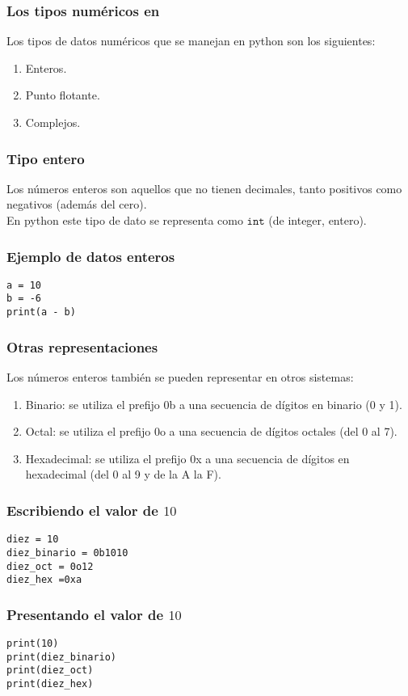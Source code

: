 \documentclass[12pt]{beamer}
\begin{document}
\begin{frame}
\frametitle{Los tipos numéricos en \python}
Los tipos de datos numéricos que se manejan en python son los siguientes:
\begin{enumerate}[<+->]
\item Enteros.
\item Punto flotante.
\item Complejos.
\end{enumerate}
\end{frame}
\begin{frame}
\frametitle{Tipo entero}
Los números enteros son aquellos que no tienen decimales, tanto positivos como negativos (además del cero).
\\
\bigskip
\pause
En python este tipo de dato se representa como $\texttt{int}$ (de integer, entero).
\end{frame}
\begin{frame}[fragile]
\frametitle{Ejemplo de datos enteros}
\begin{lstlisting}[caption=Ejecuta el código y revisa el resultado]
a = 10
b = -6
print(a - b)
\end{lstlisting}
\end{frame}
\begin{frame}
\frametitle{Otras representaciones}
Los números enteros también se pueden representar en otros sistemas:
\pause
{}
\begin{enumerate}[<+->]
\item Binario: se utiliza el prefijo 0b a una secuencia de dígitos en binario (0 y 1).
\item Octal: se utiliza el prefijo 0o a una secuencia de dígitos octales (del 0 al 7).
\item Hexadecimal: se utiliza el prefijo 0x a una secuencia de dígitos en hexadecimal (del 0 al 9 y de la A la F).
\end{enumerate}
\end{frame}
\begin{frame}[fragile]
\frametitle{Escribiendo el valor de $10$}
\begin{lstlisting}[caption=Representando otros formatos]
diez = 10
diez_binario = 0b1010
diez_oct = 0o12
diez_hex =0xa
\end{lstlisting}
\end{frame}
\begin{frame}[fragile]
\frametitle{Presentando el valor de $10$}
\begin{lstlisting}[caption=Ejecuta el código para revisar el resultado]
print(10)
print(diez_binario)
print(diez_oct)
print(diez_hex)
\end{lstlisting}
\end{frame}
\end{document}
